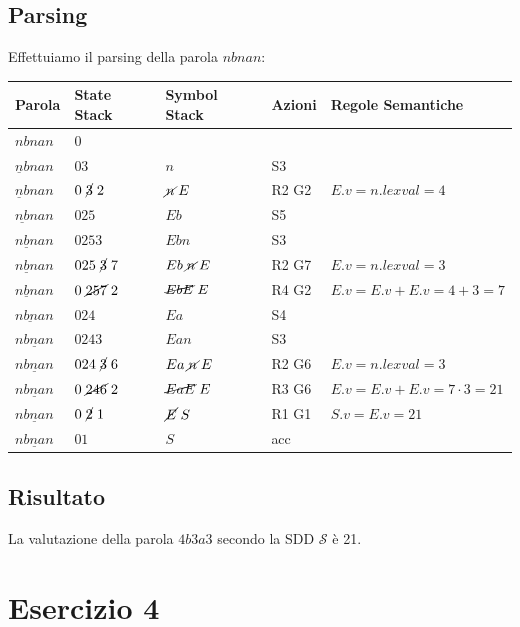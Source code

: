 \documentclass[11pt]{article}
\begin{document}
\subsection{Parsing}
Effettuiamo il parsing della parola $nbnan$:
\begin{table}[H]
  \begin{tabular}{lllll}
    \textbf{Parola} & \textbf{State Stack} & \textbf{Symbol Stack} & \textbf{Azioni} & \textbf{Regole Semantiche}\\
    \hline
    $nbnan$ & 0 &  \\
    $\underline n bnan$ & $03$ & $n$ & S3 & \\
    $\underline n bnan$ & $0\mathrel{\cancel 3}2$ & $\mathrel{\cancel  n} E$ & R2 G2 & $E.v = n.{lexval} = 4$\\
    $\underline {nb} nan$ & $025$ & $Eb$ & S5 & \\
    $\underline {nbn} an$ & $0253$ & $Ebn$ & S3 & \\
    $\underline {nbn} an$ & $025\mathrel{\cancel 3}7$ & $Eb\mathrel{\cancel  n}E$ & R2 G7 & $E.v = n.{lexval} = 3$\\
    $\underline {nbn} an$ & $0\mathrel{\cancel{257}}2$ & $\mathrel{\cancel{EbE}}E$ & R4 G2 & $E.v = E.v + E.v = 4 + 3 = 7$ \\
    $\underline {nbna} n$ & $024$ & $Ea$ & S4 & \\
    $\underline {nbnan} $ & $0243$ & $Ean$ & S3 & \\
    $\underline {nbnan} $ & $024\mathrel{\cancel 3} 6$ & $Ea\mathrel{\cancel  n} E$ & R2 G6 & $E.v = n.{lexval} = 3$ \\
    $\underline {nbnan} $ & $0\mathrel{\cancel{246}} 2$ & $\mathrel{\cancel{EaE}}E$ & R3 G6 & $E.v = E.v + E.v = 7 \cdot 3 = 21$ \\
    $\underline {nbnan} $ & $0\mathrel{\cancel 2}1$ & $\mathrel{\cancel E}S$ & R1 G1 & $S.v = E.v = 21$ \\
    $\underline {nbnan} $ & $01$ & $S$ & acc &  \\
  \end{tabular}
\label{tab:03-parsing-a}
\end{table}
\subsection{Risultato}
La valutazione della parola $4b3a3$ secondo la SDD $\mathcal S$ è 21.
\newpage
\section{Esercizio 4}
\end{document}
